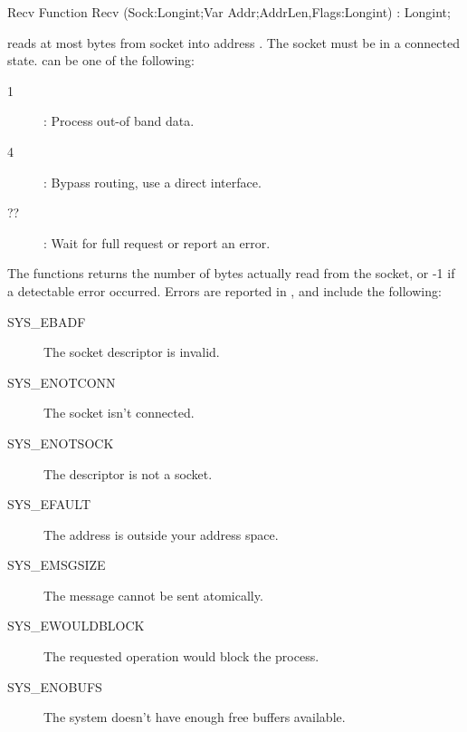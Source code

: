 \begin{function}{Recv}
\Declaration
Function Recv (Sock:Longint;Var Addr;AddrLen,Flags:Longint) : Longint;

\Description
{} reads at most  bytes from socket  into
address . The socket must be in a connected state.
 can be one of the following:
\begin{description}
\item [1] : Process out-of band data.
\item [4] : Bypass routing, use a direct interface.
\item [??] : Wait for full request or report an error.
\end{description}
The functions returns the number of bytes actually read from the socket, or
-1 if a detectable error occurred.
\Errors
Errors are reported in , and include the following:
\begin{description}
\item[SYS\_EBADF] The socket descriptor is invalid.
\item[SYS\_ENOTCONN] The socket isn't connected.
\item[SYS\_ENOTSOCK] The descriptor is not a socket.
\item[SYS\_EFAULT] The address is outside your address space.
\item[SYS\_EMSGSIZE] The message cannot be sent atomically.
\item[SYS\_EWOULDBLOCK] The requested operation would block the process.
\item[SYS\_ENOBUFS] The system doesn't have enough free buffers available.
\end{description}

\SeeAlso
{}
\end{function}
